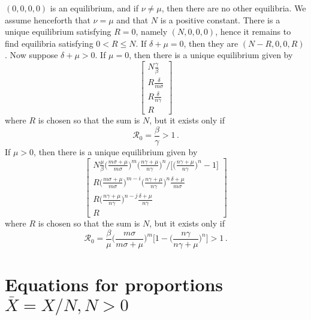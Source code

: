 \documentclass[fleqn]{article}
\begin{document}
$(0, 0, 0, 0)$ is an equilibrium, and if $\nu \neq \mu$,
then there are no other equilibria.
We assume henceforth that $\nu = \mu$ and that $N$ is a positive constant.
There is a unique equilibrium satisfying $R = 0$,
namely $(N, 0, 0, 0)$,
hence it remains to find equilibria satisfying $0 < R \leq N$.
If $\delta + \mu = 0$, then they are $(N - R, 0, 0, R)$.
Now suppose $\delta + \mu > 0$.  If $\mu = 0$, then there is a
unique equilibrium given by
\begin{equation}
\begin{bmatrix}
  N \frac{\gamma}{\beta} \\
  R \frac{\delta}{m \sigma} \\
  R \frac{\delta}{n \gamma} \\
  R
\end{bmatrix}
\end{equation}
where $R$ is chosen so that the sum is $N$, but it exists only if
\begin{equation}
\mathcal{R}_{0} = \frac{\beta}{\gamma} > 1\,.
\end{equation}
If $\mu > 0$, then there is a unique equilibrium given by
\begin{equation}
\begin{bmatrix}
  \left.N \frac{\mu}{\beta} \big(\frac{m \sigma + \mu}{m \sigma}\big)^{m} \big(\frac{n \gamma + \mu}{n \gamma}\big)^{n} \big/ \big[\big(\frac{n \gamma + \mu}{n \gamma}\big)^{n} - 1\big]\right. \\
  R \big(\frac{m \sigma + \mu}{m \sigma}\big)^{m - i} \big(\frac{n \gamma + \mu}{n \gamma}\big)^{n} \frac{\delta + \mu}{m \sigma} \\
  R \big(\frac{n \gamma + \mu}{n \gamma}\big)^{n - j} \frac{\delta + \mu}{n \gamma} \\
  R
\end{bmatrix}
\end{equation}
where $R$ is chosen so that the sum is $N$, but it exists only if
\begin{equation}
\mathcal{R}_{0} = \frac{\beta}{\mu} \Big(\frac{m \sigma}{m \sigma + \mu}\Big)^{m} \Big[1 - \Big(\frac{n \gamma}{n \gamma + \mu}\Big)^{n}\Big] > 1\,.
\end{equation}


\section{Equations for proportions $\bar{X} = X/N, N > 0$}
\end{document}
